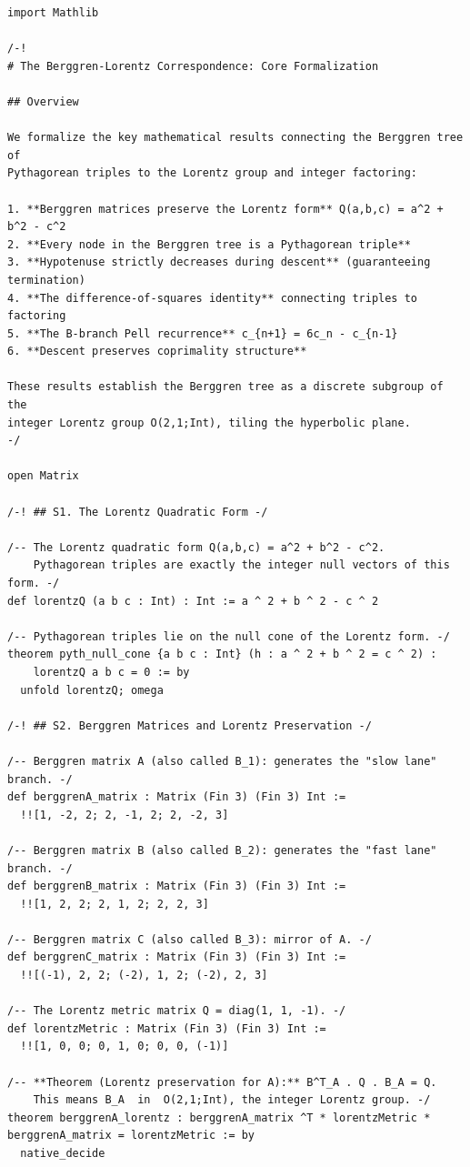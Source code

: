 \documentclass[11pt,openright,twoside]{book}
\theoremstyle{definition}
\begin{document}
\begin{lstlisting}[style=lean]
import Mathlib

/-!
# The Berggren-Lorentz Correspondence: Core Formalization

## Overview

We formalize the key mathematical results connecting the Berggren tree of
Pythagorean triples to the Lorentz group and integer factoring:

1. **Berggren matrices preserve the Lorentz form** Q(a,b,c) = a^2 + b^2 - c^2
2. **Every node in the Berggren tree is a Pythagorean triple**
3. **Hypotenuse strictly decreases during descent** (guaranteeing termination)
4. **The difference-of-squares identity** connecting triples to factoring
5. **The B-branch Pell recurrence** c_{n+1} = 6c_n - c_{n-1}
6. **Descent preserves coprimality structure**

These results establish the Berggren tree as a discrete subgroup of the
integer Lorentz group O(2,1;Int), tiling the hyperbolic plane.
-/

open Matrix

/-! ## S1. The Lorentz Quadratic Form -/

/-- The Lorentz quadratic form Q(a,b,c) = a^2 + b^2 - c^2.
    Pythagorean triples are exactly the integer null vectors of this form. -/
def lorentzQ (a b c : Int) : Int := a ^ 2 + b ^ 2 - c ^ 2

/-- Pythagorean triples lie on the null cone of the Lorentz form. -/
theorem pyth_null_cone {a b c : Int} (h : a ^ 2 + b ^ 2 = c ^ 2) :
    lorentzQ a b c = 0 := by
  unfold lorentzQ; omega

/-! ## S2. Berggren Matrices and Lorentz Preservation -/

/-- Berggren matrix A (also called B_1): generates the "slow lane" branch. -/
def berggrenA_matrix : Matrix (Fin 3) (Fin 3) Int :=
  !![1, -2, 2; 2, -1, 2; 2, -2, 3]

/-- Berggren matrix B (also called B_2): generates the "fast lane" branch. -/
def berggrenB_matrix : Matrix (Fin 3) (Fin 3) Int :=
  !![1, 2, 2; 2, 1, 2; 2, 2, 3]

/-- Berggren matrix C (also called B_3): mirror of A. -/
def berggrenC_matrix : Matrix (Fin 3) (Fin 3) Int :=
  !![(-1), 2, 2; (-2), 1, 2; (-2), 2, 3]

/-- The Lorentz metric matrix Q = diag(1, 1, -1). -/
def lorentzMetric : Matrix (Fin 3) (Fin 3) Int :=
  !![1, 0, 0; 0, 1, 0; 0, 0, (-1)]

/-- **Theorem (Lorentz preservation for A):** B^T_A . Q . B_A = Q.
    This means B_A  in  O(2,1;Int), the integer Lorentz group. -/
theorem berggrenA_lorentz : berggrenA_matrix ^T * lorentzMetric * berggrenA_matrix = lorentzMetric := by
  native_decide


\end{lstlisting}
\end{document}

